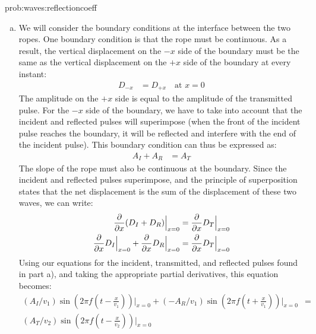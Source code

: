 \begin{solution}{prob:waves:reflectioncoeff}
\begin{enumerate}[(a)]
The transmitted wave (denoted by the subscript $T$) will also travel in the positive $x$ direction, but its speed will be $v_2$, since it travels through the second rope:
\begin{align*}
D_T&=A_T\cos \left( 2\pi f\left(t-\frac{x}{v_2}\right)\right)
\end{align*}
The reflected wave (denoted by $R$) will travel in the $-x$ direction and at the same speed as the incident pulse.
\begin{align*}
D_R&=A_R\cos \left( 2\pi f\left(t+\frac{x}{v_1}\right)\right)
\end{align*}
\item We will consider the boundary conditions at the interface between the two ropes. One boundary condition is that the rope must be continuous. As a result, the vertical displacement on the $-x$ side of the boundary must be the same as the vertical displacement on the $+x$ side of the boundary at every instant: 
\begin{align*}
D_{-x}&=D_{+x}\quad\text{at $x=0$}
\end{align*}
The amplitude on the $+x$ side is equal to the amplitude of the transmitted pulse. For the $-x$ side of the boundary, we have to take into account that the incident and reflected pulses will superimpose (when the front of the incident pulse reaches the boundary, it will be reflected and interfere with the end of the incident pulse). This boundary condition can thus be expressed as:
\begin{align*}
A_I+A_R&=A_T
\end{align*}
The slope of the rope must also be continuous at the boundary. Since the incident and reflected pulses superimpose, and the principle of superposition states that the net displacement is the sum of the displacement of these two waves, we can write:
\begin{align*}
\frac{\partial }{\partial x}(D_I+D_R)\Bigr|_{x=0}&=\frac{\partial }{\partial x}D_T\Bigr|_{x=0}\\
\frac{\partial }{\partial x}D_I\Bigr|_{x=0}+\frac{\partial }{\partial x}D_R\Bigr|_{x=0}&=\frac{\partial }{\partial x}D_T\Bigr|_{x=0}
\end{align*}
Using our equations for the incident, transmitted, and reflected pulses found in part a), and taking the appropriate partial derivatives, this equation becomes:
\begin{align*}
(A_I/v_1) \sin \left(2\pi f\left( t-\frac{x}{v_1}\right)\right)\Bigr|_{x=0}+(-A_R/v_1) \sin \left( 2\pi f\left( t+\frac{x}{v_1}\right)\right)\Bigr|_{x=0}&=\\(A_T/v_2) \sin \left( 2\pi f\left( t-\frac{x}{v_2}\right)\right)\Bigr|_{x=0}

\end{align*}
\end{enumerate}
\end{solution}
